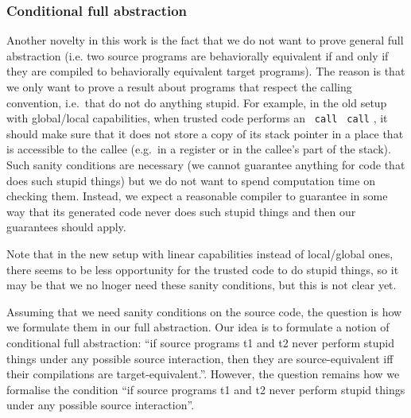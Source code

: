 \documentclass[a4paper]{article}
\newcommand{\sourcecolor}[1]{\color{blue}}
\newcommand{\src}[1]{{\sourcecolor{} #1}}
\newcommand{\zinstr}[1]{\texttt{#1}}
\newcommand{\twoinstr}[3]{
  \ifthenelse{\equal{#2#3}{}}
  {\zinstr{#1}}
  {\zinstr{#1} \; #2 \; #3}
}
\newcommand{\scall}[2]{\twoinstr{\src{call}}{#1}{#2}}
\begin{document}
\subsubsection{Conditional full abstraction}
\label{sec:conditional-full-abstraction}

Another novelty in this work is the fact that we do not want to prove general full abstraction (i.e. two source programs are behaviorally equivalent if and only if they are compiled to behaviorally equivalent target programs).
The reason is that we only want to prove a result about programs that respect the calling convention, i.e.\ that do not do anything stupid.
For example, in the old setup with global/local capabilities, when trusted code performs an \scall{}{}, it should make sure that it does not store a copy of its stack pointer in a place that is accessible to the callee (e.g.\ in a register or in the callee's part of the stack).
Such sanity conditions are necessary (we cannot guarantee anything for code that does such stupid things) but we do not want to spend computation time on checking them.
Instead, we expect a reasonable compiler to guarantee in some way that its generated code never does such stupid things and then our guarantees should apply.

Note that in the new setup with linear capabilities instead of local/global ones, there seems to be less opportunity for the trusted code to do stupid things, so it may be that we no lnoger need these sanity conditions, but this is not clear yet.

Assuming that we need sanity conditions on the source code, the question is how we formulate them in our full abstraction.
Our idea is to formulate a notion of conditional full abstraction: ``if source programs t1 and t2 never perform stupid things under any possible source interaction, then they are source-equivalent iff their compilations are target-equivalent.''.
However, the question remains how we formalise the condition ``if source programs t1 and t2 never perform stupid things under any possible source interaction''.
\end{document}
